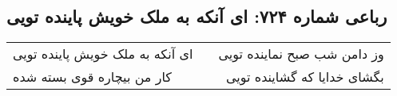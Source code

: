 \begin{center}
\section*{رباعی شماره ۷۲۴: ای آنکه به ملک خویش پاینده تویی}
\label{sec:sh724}
\begin{longtable}{l p{0.5cm} r}
ای آنکه به ملک خویش پاینده تویی
&&
وز دامن شب صبح نماینده تویی
\\
کار من بیچاره قوی بسته شده
&&
بگشای خدایا که گشاینده تویی
\\
\end{longtable}
\end{center}
